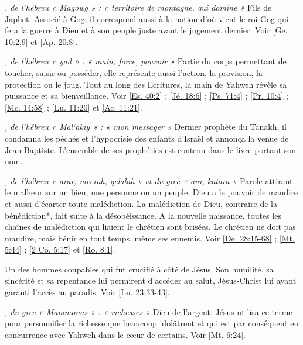 \begin{multicols}{2}
\textit{, de l'hébreu « Magowg » : « territoire de montagne, qui domine »}\newline
Fils de Japhet. Associé à Gog, il correspond aussi à la nation d'où vient le roi Gog qui fera la guerre à Dieu et à son peuple juste avant le jugement dernier. Voir \vref{Ge. 10:2,9} et \vref{Ap. 20:8}.

\textit{, de l'hébreu « yad » : « main, force, pouvoir »}\newline
Partie du corps permettant de toucher, saisir ou posséder, elle représente aussi l'action, la provision, la protection ou le joug. Tout au long des Ecritures, la main de Yahweh révèle sa puissance et sa bienveillance. Voir \vref{Es. 40:2} ; \vref{Jé. 18:6} ; \vref{Ps. 71:4} ; \vref{Pr. 10:4} ; \vref{Mc. 14:58} ; \vref{Lu. 11:20} et \vref{Ac. 11:21}.

\textit{, de l'hébreu « Mal`akiy » : « mon messager »}\newline
Dernier prophète du Tanakh, il condamna les péchés et l'hypocrisie des enfants d'Israël et annonça la venue de Jean-Baptiste. L'ensemble de ses prophéties est contenu dans le livre portant son nom.

\textit{, de l'hébreu « arar, meerah, qelalah » et du grec « ara, katara »}\newline
Parole attirant le malheur sur un bien, une personne ou un peuple. Dieu a le pouvoir de maudire et aussi d'écarter toute malédiction. La malédiction de Dieu, contraire de la bénédiction*, fait suite à la désobéissance. A la nouvelle naissance, toutes les chaînes de malédiction qui liaient le chrétien sont brisées. Le chrétien ne doit pas maudire, mais bénir en tout temps, même ses ennemis. Voir \vref{De. 28:15-68} ; \vref{Mt. 5:44} ; \vref{2 Co. 5:17} et \vref{Ro. 8:1}.

\textit{}\newline
Un des hommes coupables qui fut crucifié à côté de Jésus. Son humilité, sa sincérité et sa repentance lui permirent d'accéder au salut, Jésus-Christ lui ayant garanti l'accès au paradis. Voir \vref{Lu. 23:33-43}.

\textit{, du grec « Mammonas » : « richesses »}\newline
Dieu de l'argent. Jésus utilisa ce terme pour personnifier la richesse que beaucoup idolâtrent et qui est par conséquent en concurrence avec Yahweh dans le cœur de certains. Voir \vref{Mt. 6:24}.


\end{multicols}
